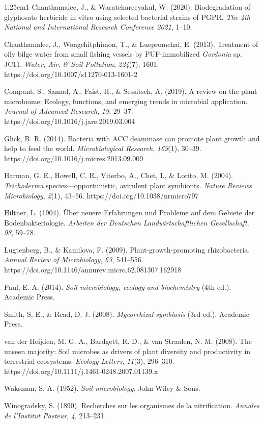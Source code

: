\begin{hangparas}{1.25cm}{1}
Chanthamalee, J., \& Waratchareeyakul, W. (2020). Biodegradation of glyphosate herbicide in vitro using selected bacterial strains of PGPR. \textit{The 4th National and International Research Conference 2021}, 1--10.

Chanthamalee, J., Wongchitphimon, T., \& Luepromchai, E. (2013). Treatment of oily bilge water from small fishing vessels by PUF-immobilized \textit{Gordonia} sp. JC11. \textit{Water, Air, \& Soil Pollution}, \textit{224}(7), 1601. https://doi.org/10.1007/s11270-013-1601-2

Compant, S., Samad, A., Faist, H., \& Sessitsch, A. (2019). A review on the plant microbiome: Ecology, functions, and emerging trends in microbial application. \textit{Journal of Advanced Research}, \textit{19}, 29--37. https://doi.org/10.1016/j.jare.2019.03.004

Glick, B. R. (2014). Bacteria with ACC deaminase can promote plant growth and help to feed the world. \textit{Microbiological Research}, \textit{169}(1), 30--39. https://doi.org/10.1016/j.micres.2013.09.009

Harman, G. E., Howell, C. R., Viterbo, A., Chet, I., \& Lorito, M. (2004). \textit{Trichoderma} species—opportunistic, avirulent plant symbionts. \textit{Nature Reviews Microbiology}, \textit{2}(1), 43--56. https://doi.org/10.1038/nrmicro797

Hiltner, L. (1904). Über neuere Erfahrungen und Probleme auf dem Gebiete der Bodenbakteriologie. \textit{Arbeiten der Deutschen Landwirtschaftlichen Gesellschaft}, \textit{98}, 59--78.

Lugtenberg, B., \& Kamilova, F. (2009). Plant-growth-promoting rhizobacteria. \textit{Annual Review of Microbiology}, \textit{63}, 541--556. https://doi.org/10.1146/annurev.micro.62.081307.162918

Paul, E. A. (2014). \textit{Soil microbiology, ecology and biochemistry} (4th ed.). Academic Press.

Smith, S. E., \& Read, D. J. (2008). \textit{Mycorrhizal symbiosis} (3rd ed.). Academic Press.

van der Heijden, M. G. A., Bardgett, R. D., \& van Straalen, N. M. (2008). The unseen majority: Soil microbes as drivers of plant diversity and productivity in terrestrial ecosystems. \textit{Ecology Letters}, \textit{11}(3), 296--310. https://doi.org/10.1111/j.1461-0248.2007.01139.x

Waksman, S. A. (1952). \textit{Soil microbiology}. John Wiley \& Sons.

Winogradsky, S. (1890). Recherches sur les organismes de la nitrification. \textit{Annales de l'Institut Pasteur}, \textit{4}, 213--231.
\end{hangparas}

\clearpage
